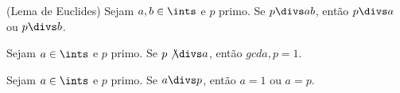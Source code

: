 \begin{exercise}
  (Lema de Euclides) Sejam $a,b \in \ints$ e $p$ primo. Se $p \divs ab$, ent\~ao
  $p \divs a$ ou $p \divs b$.
\end{exercise}

\begin{exercise}
  Sejam $a \in \ints$ e $p$ primo. Se $p \not\divs a$, ent\~ao $gcd{a,p} = 1$.
\end{exercise}

\begin{homework}
  Sejam $a \in \ints$ e $p$ primo. Se $a \divs p$, ent\~ao $a=1$ ou $a=p$.
\end{homework}
